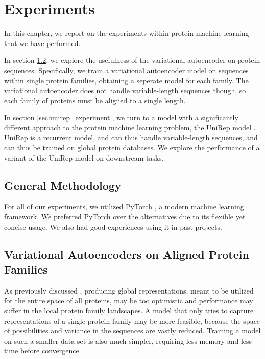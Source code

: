 \chapter{Experiments}


In this chapter, we report on the experiments within protein machine learning that we have performed.

In section \ref{sec:variational_autoencoders_experiement}, we explore the usefulness of the variational autoencoder on protein sequences. Specifically, we train a variational autoencoder model on sequences within single protein families, obtaining a seperate model for each family. The variational autoencoder does not handle variable-length sequences though, so each family of proteins must be aligned to a single length.

In section \ref{sec:unirep_experiment}, we turn to a model with a significantly different approach to the protein machine learning problem, the UniRep model \cite{alley2019unified}. UniRep is a recurrent model, and can thus handle variable-length sequences, and can thus be trained on global protein databases. We explore the performance of a variant of the UniRep model on downstream tasks.

\section{General Methodology}
For all of our experiments, we utilized PyTorch \cite{NEURIPS2019_9015}, a modern machine learning framework. We preferred PyTorch over the alternatives due to its flexible yet concise usage. We also had good experiences using it in past projects.

\section{Variational Autoencoders on Aligned Protein Families}
\label{sec:variational_autoencoders_experiement}

As previously discussed , producing global representations, meant to be utilized for the entire space of all proteins, may be too optimistic and performance may suffer in the local protein family landscapes. A model that only tries to capture representations of a single protein family may be more feasible, because the space of possibilities and variance in the sequences are vastly reduced. Training a model on such a smaller data-set is also much simpler, requiring less memory and less time before convergence.

